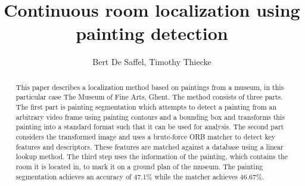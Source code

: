 \documentclass[10pt,final,journal]{IEEEtran}
\title{Continuous room localization using painting detection}
\author{Bert De Saffel, Timothy Thiecke}
\begin{document}
	\maketitle
	\begin{abstract}
		This paper describes a localization method based on paintings from a museum, in this particular case The Museum of Fine Arts, Ghent. The method consists of three parts. The first part is painting segmentation which attempts to detect a painting from an arbitrary video frame using painting contours and a bounding box and transforms this painting into a standard format such that it can be used for analysis. The second part considers the transformed image and uses a brute-force ORB  matcher to detect key features and descriptors. These features are matched against a database using a linear lookup method. The third step uses the information of the painting, which contains the room it is located in, to mark it on a ground plan of the museum.	The painting segmentation achieves an accuracy of 47.1\% while the matcher achieves 46.67\%.
	\end{abstract}

	
	
	
	
	

	
	
\end{document}
